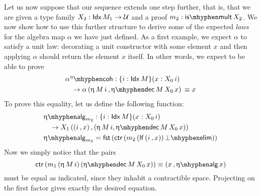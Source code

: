Let us now suppose that our sequence extends one step further, that
is, that we are given a type family $ X_2 : \mathsf{Idx}\, M_1 \to \mathcal{U} $ and a
proof $m_2 : \ismult X_2$.  We now show how to use this further
structure to derive some of the expected \emph{laws} for the algebra
map $\alpha$ we have just defined.  As a first example, we expect
$\alpha$ to satisfy a unit law: decorating a unit constructor with
some element $x$ and then applying $\alpha$ should return the element
$x$ itself.  In other words, we expect to be able to prove
\begin{align*}
  &\alpha^{\eta}\coh : \{i : \Idx M\} (x : X_0\, i) \\
  &\hspace{.3cm} \to \alpha\, (\upeta\, M\, i \,, \etadec M\, X_0\, x)\, \equiv x
\end{align*}
To prove this equality, let us define the following function:
\begin{align*}
  &\upeta\alg_{m_2} : \{i : \Idx M\} (x : X_0\, i) \\
  &\hspace{.3cm} \to X_1\, ((i \,, x) \,, (\upeta\, M\, i , \etadec M\, X_0\, x)) \\
  &\upeta\alg_{m_2} = \fst (\ctr (m_2\, (\lf (i \,, x))\, \botelim)) 
\end{align*}
Now we simply notice that the pairs
\[ \ctr (m_1\, (\upeta\, M\, i)\, (\etadec M\, X_0\, x)) \equiv (x \,,
  \upeta\alg\, x) \] must be equal as indicated, since they inhabit a
contractible space.  Projecting on the first factor gives exactly the
desired equation.

